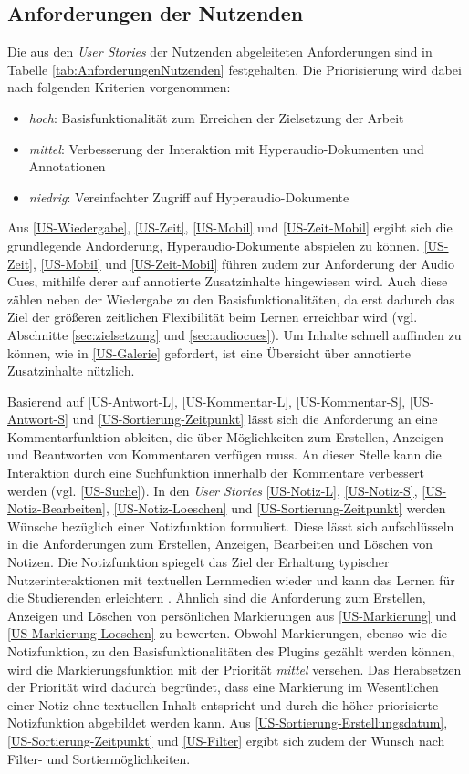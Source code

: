 \subsection{Anforderungen der Nutzenden}
Die aus den \textit{User Stories} der Nutzenden abgeleiteten Anforderungen sind in Tabelle \ref{tab:AnforderungenNutzenden} festgehalten. Die Priorisierung wird dabei nach folgenden Kriterien vorgenommen:

\begin{itemize}
\item \textit{hoch}: Basisfunktionalität zum Erreichen der Zielsetzung der Arbeit
\item \textit{mittel}: Verbesserung der Interaktion mit Hyperaudio-Dokumenten und Annotationen
\item \textit{niedrig}: Vereinfachter Zugriff auf Hyperaudio-Dokumente
\end{itemize}


Aus \ref{US-Wiedergabe}, \ref{US-Zeit}, \ref{US-Mobil} und \ref{US-Zeit-Mobil} ergibt sich die grundlegende Andorderung, Hyperaudio-Dokumente abspielen zu können. \ref{US-Zeit}, \ref{US-Mobil} und \ref{US-Zeit-Mobil} führen zudem zur Anforderung der Audio Cues, mithilfe derer auf annotierte Zusatzinhalte hingewiesen wird. Auch diese zählen neben der Wiedergabe zu den Basisfunktionalitäten, da erst dadurch das Ziel der größeren zeitlichen Flexibilität beim Lernen erreichbar wird (vgl. Abschnitte \ref{sec:zielsetzung} und \ref{sec:audiocues}). Um Inhalte schnell auffinden zu können, wie in \ref{US-Galerie} gefordert, ist eine Übersicht über annotierte Zusatzinhalte nützlich.

Basierend auf \ref{US-Antwort-L}, \ref{US-Kommentar-L}, \ref{US-Kommentar-S}, \ref{US-Antwort-S} und \ref{US-Sortierung-Zeitpunkt} lässt sich die Anforderung an eine Kommentarfunktion ableiten, die über Möglichkeiten zum Erstellen, Anzeigen und Beantworten von Kommentaren verfügen muss. An dieser Stelle kann die Interaktion durch eine Suchfunktion innerhalb der Kommentare verbessert werden (vgl. \ref{US-Suche}). In den \textit{User Stories} \ref{US-Notiz-L}, \ref{US-Notiz-S}, \ref{US-Notiz-Bearbeiten}, \ref{US-Notiz-Loeschen} und \ref{US-Sortierung-Zeitpunkt} werden Wünsche bezüglich einer Notizfunktion formuliert. Diese lässt sich aufschlüsseln in die Anforderungen zum Erstellen, Anzeigen, Bearbeiten und Löschen von Notizen. Die Notizfunktion spiegelt das Ziel der Erhaltung typischer Nutzerinteraktionen mit textuellen Lernmedien wieder und kann das Lernen für die Studierenden erleichtern \citep{scutter2010students}. Ähnlich sind die Anforderung zum Erstellen, Anzeigen und Löschen von persönlichen Markierungen aus \ref{US-Markierung} und \ref{US-Markierung-Loeschen} zu bewerten. Obwohl Markierungen, ebenso wie die Notizfunktion, zu den Basisfunktionalitäten des Plugins gezählt werden können, wird die Markierungsfunktion mit der Priorität \textit{mittel} versehen. Das Herabsetzen der Priorität wird dadurch begründet, dass eine Markierung im Wesentlichen einer Notiz ohne textuellen Inhalt entspricht und durch die höher priorisierte Notizfunktion abgebildet werden kann. Aus \ref{US-Sortierung-Erstellungsdatum}, \ref{US-Sortierung-Zeitpunkt} und \ref{US-Filter} ergibt sich zudem der Wunsch nach Filter- und Sortiermöglichkeiten. 

